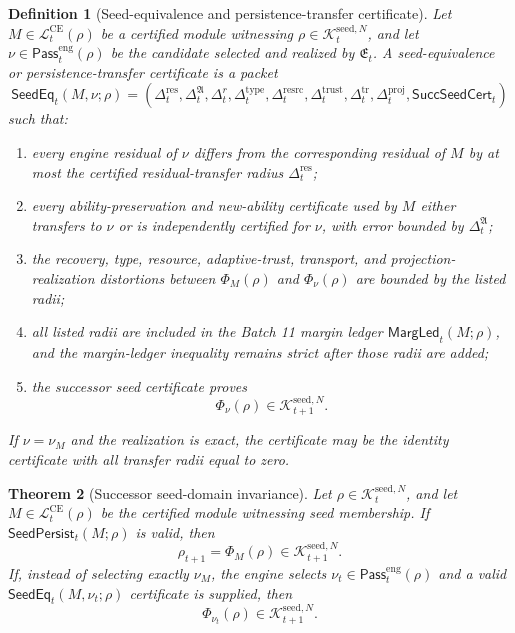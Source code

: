 \documentclass[11pt]{article}
\newtheorem{theorem}{Theorem}[section]
\newtheorem{definition}[theorem]{Definition}
\newcommand{\Lcal}{\mathcal{L}}
\newcommand{\1}{\mathbf{1}}
\providecommand{\Kcal}{\mathcal{K}}
\begin{document}
\begin{definition}[Seed-equivalence and persistence-transfer certificate]
\label{def:batch11_seed_equivalence_transfer_certificate}
Let \(M\in\Lcal_t^{\mathrm{CE}}(\rho)\) be a certified module witnessing
\(\rho\in\Kcal_t^{\mathrm{seed},N}\), and let
\(\nu\in\mathsf{Pass}_t^{\mathrm{eng}}(\rho)\) be the candidate selected and realized by
\(\mathfrak E_t\).  A seed-equivalence or persistence-transfer certificate is a packet
\[
\mathsf{SeedEq}_t(M,\nu;\rho)
=
(\Delta_t^{\mathrm{res}},\Delta_t^{\mathfrak A},
\Delta_t^{r},\Delta_t^{\mathrm{type}},
\Delta_t^{\mathrm{resrc}},\Delta_t^{\mathrm{trust}},
\Delta_t^{\mathrm{tr}},\Delta_t^{\mathrm{proj}},
\mathsf{SuccSeedCert}_t)
\]
such that:
\begin{enumerate}[label=(\roman*),leftmargin=1.5em]
    \item every engine residual of \(\nu\) differs from the corresponding residual of
    \(M\) by at most the certified residual-transfer radius
    \(\Delta_t^{\mathrm{res}}\);
    \item every ability-preservation and new-ability certificate used by \(M\)
    either transfers to \(\nu\) or is independently certified for \(\nu\), with
    error bounded by \(\Delta_t^{\mathfrak A}\);
    \item the recovery, type, resource, adaptive-trust, transport, and
    projection-realization distortions between \(\Phi_M(\rho)\) and
    \(\Phi_\nu(\rho)\) are bounded by the listed radii;
    \item all listed radii are included in the Batch 11 margin ledger
    \(\mathsf{MargLed}_t(M;\rho)\), and the margin-ledger inequality remains
    strict after those radii are added;
    \item the successor seed certificate proves
    \[
    \Phi_\nu(\rho)\in\Kcal_{t+1}^{\mathrm{seed},N}.
    \]
\end{enumerate}
If \(\nu=\nu_M\) and the realization is exact, the certificate may be the identity
certificate with all transfer radii equal to zero.
\end{definition}

\begin{theorem}[Successor seed-domain invariance]
\label{thm:batch11_successor_seed_domain_invariance}
Let \(\rho\in\Kcal_t^{\mathrm{seed},N}\), and let \(M\in\Lcal_t^{\mathrm{CE}}(\rho)\) be the certified module witnessing seed membership.  If \(\mathsf{SeedPersist}_t(M;\rho)\) is valid, then
\[
\rho_{t+1}=\Phi_M(\rho)
\in
\Kcal_{t+1}^{\mathrm{seed},N}.
\]
If, instead of selecting exactly \(\nu_M\), the engine selects
\(\nu_t\in\mathsf{Pass}_t^{\mathrm{eng}}(\rho)\) and a valid
\(\mathsf{SeedEq}_t(M,\nu_t;\rho)\) certificate is supplied, then
\[
\Phi_{\nu_t}(\rho)
\in
\Kcal_{t+1}^{\mathrm{seed},N}.
\]
\end{theorem}
\end{document}
